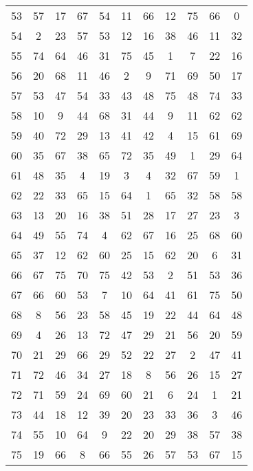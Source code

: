 \begin{table}
\begin{tabular}{c c c c c c c c c c c }
53 & 57 & 17 & 67 & 54 & 11 & 66 & 12 & 75 & 66 & 0 \\
54 & 2 & 23 & 57 & 53 & 12 & 16 & 38 & 46 & 11 & 32 \\
55 & 74 & 64 & 46 & 31 & 75 & 45 & 1 & 7 & 22 & 16 \\
56 & 20 & 68 & 11 & 46 & 2 & 9 & 71 & 69 & 50 & 17 \\
57 & 53 & 47 & 54 & 33 & 43 & 48 & 75 & 48 & 74 & 33 \\
58 & 10 & 9 & 44 & 68 & 31 & 44 & 9 & 11 & 62 & 62 \\
59 & 40 & 72 & 29 & 13 & 41 & 42 & 4 & 15 & 61 & 69 \\
60 & 35 & 67 & 38 & 65 & 72 & 35 & 49 & 1 & 29 & 64 \\
61 & 48 & 35 & 4 & 19 & 3 & 4 & 32 & 67 & 59 & 1 \\
62 & 22 & 33 & 65 & 15 & 64 & 1 & 65 & 32 & 58 & 58 \\
63 & 13 & 20 & 16 & 38 & 51 & 28 & 17 & 27 & 23 & 3 \\
64 & 49 & 55 & 74 & 4 & 62 & 67 & 16 & 25 & 68 & 60 \\
65 & 37 & 12 & 62 & 60 & 25 & 15 & 62 & 20 & 6 & 31 \\
66 & 67 & 75 & 70 & 75 & 42 & 53 & 2 & 51 & 53 & 36 \\
67 & 66 & 60 & 53 & 7 & 10 & 64 & 41 & 61 & 75 & 50 \\
68 & 8 & 56 & 23 & 58 & 45 & 19 & 22 & 44 & 64 & 48 \\
69 & 4 & 26 & 13 & 72 & 47 & 29 & 21 & 56 & 20 & 59 \\
70 & 21 & 29 & 66 & 29 & 52 & 22 & 27 & 2 & 47 & 41 \\
71 & 72 & 46 & 34 & 27 & 18 & 8 & 56 & 26 & 15 & 27 \\
72 & 71 & 59 & 24 & 69 & 60 & 21 & 6 & 24 & 1 & 21 \\
73 & 44 & 18 & 12 & 39 & 20 & 23 & 33 & 36 & 3 & 46 \\
74 & 55 & 10 & 64 & 9 & 22 & 20 & 29 & 38 & 57 & 38 \\
75 & 19 & 66 & 8 & 66 & 55 & 26 & 57 & 53 & 67 & 15 \\
\hline
\end{tabular}
\end{table}